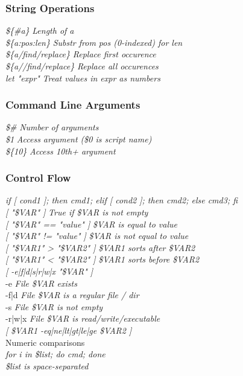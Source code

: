 \subsubsection*{String Operations}

\emph{\$\{\#a\}} \hfill \textit{Length of a}\\
\emph{\$\{a:pos:len\}} \hfill \textit{Substr from pos (0-indexed) for len}\\
\emph{\$\{a/find/replace\}} \hfill \textit{Replace first occurence}\\
\emph{\$\{a//find/replace\}} \hfill \textit{Replace all occurences}\\
\emph{let "expr"} \hfill \textit{Treat values in expr as numbers}

\subsubsection*{Command Line Arguments}

\emph{\$\#} \hfill \textit{Number of arguments}\\
\emph{\$1} \hfill \textit{Access argument (\$0 is script name)}\\
\emph{\$\{10\}} \hfill \textit{Access 10th+ argument}\\

\subsubsection*{Control Flow}

\emph{if [ cond1 ]; then cmd1; elif [ cond2 ]; then cmd2; else cmd3; fi}\\
\emph{[ "\$VAR" ]} \hfill \textit{True if \$VAR is not empty}\\
\emph{[ "\$VAR" == "value" ]} \hfill \textit{\$VAR is equal to value}\\
\emph{[ "\$VAR" != "value" ]} \hfill \textit{\$VAR is not equal to value}\\
\emph{[ "\$VAR1" \bs> "\$VAR2" ]} \hfill \textit{\$VAR1 sorts after \$VAR2}\\
\emph{[ "\$VAR1" \bs< "\$VAR2" ]} \hfill \textit{\$VAR1 sorts before \$VAR2}\\
\emph{[ -e|f|d|s|r|w|x "\$VAR" ]}\\
\quad -e \hfill \textit{File \$VAR exists}\\
\quad -f|d \hfill \textit{File \$VAR is a regular file / dir}\\
\quad -s \hfill \textit{File \$VAR is not empty}\\
\quad -r|w|x \hfill \textit{File \$VAR is read/write/executable}\\
\emph{[ \$VAR1 -eq|ne|lt|gt|le|ge \$VAR2 ]} \\ \hfill Numeric comparisons\\
\emph{for i in \$list; do cmd; done} \\\hfill \textit{\$list is space-separated}